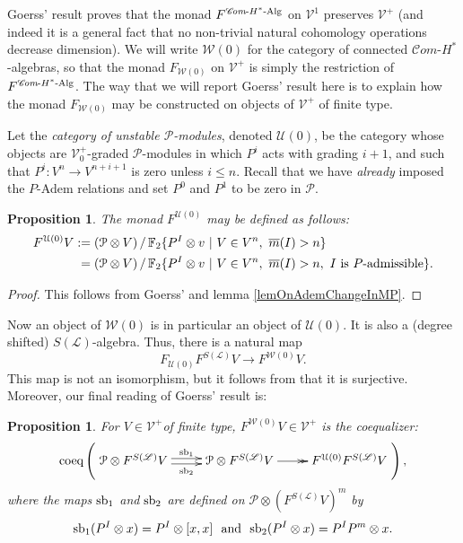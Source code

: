 \documentclass[11pt]{amsart}
\theoremstyle{plain}
\newtheorem{prop}[thm]{Proposition}
\theoremstyle{definition}
\renewcommand{\to}{\longrightarrow}
\newcommand{\scrL}{\mathscr{L}}
\newcommand{\scrC}{\mathscr{C}}
\newcommand{\calW}{\mathcal{W}}
\newcommand{\calU}{\mathcal{U}}
\newcommand{\calP}{\mathcal{P}}
\newcommand{\calV}{\mathcal{V}}
\newcommand{\calw}{\mathcal{W}}
\newcommand{\calu}{\mathcal{U}}
\theoremstyle{plain}
\newcommand{\Palg}{{\calP}}
\newcommand{\LieOperad}{{\scrL}}
\newcommand{\vect}[2]{\calV^{#1}_{#2}}
\newcommand{\HAlg}{\textup{-$H^*$-Alg}}
\newcommand{\minDimP}{\overline{m}}
\newcommand{\F}{\mathbb{F}}
\newcommand{\algs}{{\scrC\!\textit{om}}}
\begin{document}
\begin{Constructing (co)homotopy operations}
Goerss' result proves that the monad
$F^{\algs\HAlg}$ on $\vect{1}{}$
preserves $\vect{+}{}$ (and indeed it is a general fact that no non-trivial natural cohomology operations decrease dimension).
We will write $\calW(0)$ for the category of connected $\algs$-$H^*$-algebras, so that the monad $F_{\calW(0)}$ on $\vect{+}{}$ is simply the restriction of $F^{\algs\HAlg}$. The way that we will report Goerss' result here is to explain how the monad $F_{\calW(0)}$ may be constructed on objects of $\vect{+}{}$ of finite type.

Let the \emph{category of unstable $\Palg$-modules}, denoted $\calU(0)$, be the category whose objects are $\vect{+}{0}$-graded $\Palg$-modules in which $P^i$ acts with grading $i+1$, and such that $P^i:V^n\to V^{n+i+1}$ is zero unless $i\leq n$. Recall that  we have \emph{already} imposed the $P$-Adem relations and set $P^0$ and $P^1$ to be zero in $\Palg$. 
\begin{prop}
The monad $F^{\calU(0)}$ may be defined as follows:
\begin{alignat*}{2}
F^{\calU(0)}V
:={}&
(\Palg\otimes V)\,/\,\F_2\{P^I\otimes v\ |\ V\in V^n,\ \minDimP(I)>n \}%
\\
={}&
(\Palg\otimes V)\,/\,\F_2\{P^I\otimes v\ |\ V\in V^n,\ \minDimP(I)>n ,\ I\textup{ is $P$-admissible}\}.%
\end{alignat*}
\end{prop}
\begin{proof}
This follows from Goerss' \cite[Theorem I]{MR1089001} and lemma \ref{lemOnAdemChangeInMP}.
\end{proof}
Now an object of $\calw(0)$ is in particular an object of $\calU(0)$. It is also a (degree shifted) $S(\LieOperad)$-algebra. Thus, there  is a natural map 
\[F_{\calU(0)}F^{S(\LieOperad)}V\to F^{\calW(0)}V.\]
This map is not an isomorphism, but it follows from \cite[Theorem I]{MR1089001} that it is surjective. Moreover, our final reading of Goerss' result is:
\begin{prop}\label{partialgoerss}
For $V\in\vect{+}{}$of finite type,  $F^{\calW(0)}V\in \vect{+}{}$ is the coequalizer:
\[\textup{coeq}\left(\xymatrix@R=4mm{
\Palg\otimes F^{S(\LieOperad)}V
\ar@<+.5ex>[r]^-{\smash{\textup{sb}_1}}
\ar@<-.5ex>[r]_-{\textup{sb}_2}
&%
\Palg\otimes F^{S(\LieOperad)}V
\ar@{->>}[r]
&
F^{\calu(0)}F^{S(\LieOperad)}V%
}\right),\]
where the maps $\textup{sb}_1$ and $\textup{sb}_2$ are defined on  $\Palg\otimes(F^{S(\LieOperad)}V)^{m}$ by
\[\textup{sb}_1(P^I\otimes x)=P^I\otimes [x,x]\textup{ \ and \ }\textup{sb}_2(P^I\otimes x)=P^IP^m\otimes x.\]

\end{prop}
\end{Constructing (co)homotopy operations}
\end{document}

